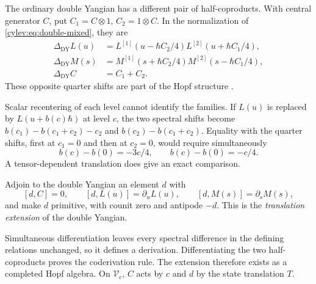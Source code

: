 The ordinary double Yangian has a different pair of half-coproducts.
With central generator $C$, put $C_1=C\otimes1$, $C_2=1\otimes C$.
In the normalization of \eqref{cylev:eq:double-mixed}, they are
\begin{align}
 \Delta_{\mathrm{DY}}L(u)
 &=L^{[1]}(u-\hbar C_2/4)L^{[2]}(u+\hbar C_1/4),
       \label{cylev:eq:dy-creation}\\
 \Delta_{\mathrm{DY}}M(s)
 &=M^{[1]}(s+\hbar C_2/4)M^{[2]}(s-\hbar C_1/4),
       \label{cylev:eq:dy-annihilation}\\
 \Delta_{\mathrm{DY}}C&=C_1+C_2.\nonumber
\end{align}
These opposite quarter shifts are part of the Hopf structure
\cite[\S4.1]{JingKozicMolevYang2017}.

Scalar recentering of each level cannot identify the families.
If $L(u)$ is replaced by $L(u+b(c)\hbar)$ at level $c$, the two
spectral shifts become
$b(c_1)-b(c_1+c_2)-c_2$ and $b(c_2)-b(c_1+c_2)$.
Equality with the quarter shifts, first at $c_1=0$ and then at
$c_2=0$, would require simultaneously
\[
 b(c)-b(0)=-3c/4,\qquad b(c)-b(0)=-c/4.
\]
A tensor-dependent translation does give an exact comparison.

\begin{definition}\label{cylev:def:translation-extension}
Adjoin to the double Yangian an element $d$ with
\[
 [d,C]=0,\qquad[d,L(u)]=\partial_uL(u),\qquad
 [d,M(s)]=\partial_sM(s),
\]
and make $d$ primitive, with counit zero and antipode $-d$.
This is the \emph{translation extension} of the double Yangian.
\end{definition}

Simultaneous differentiation leaves every spectral difference in the
defining relations unchanged, so it defines a derivation.
Differentiating the two half-coproducts proves the coderivation rule.
The extension therefore exists as a completed Hopf algebra.
On $\mathcal V_c$, $C$ acts by $c$ and $d$ by the state translation $T$.

